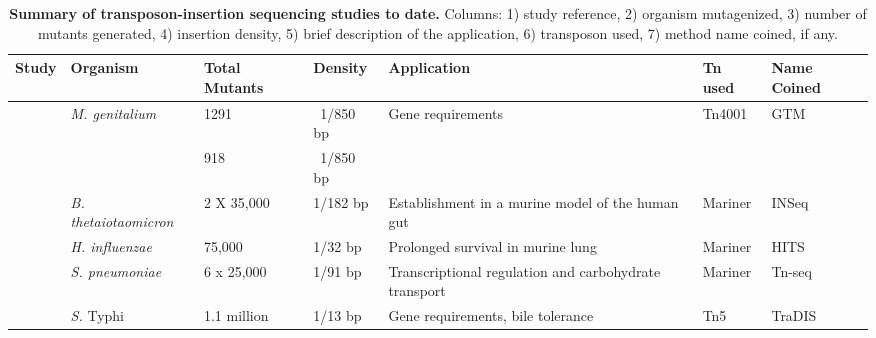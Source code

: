 %
\begingroup
\begin{landscape}
   \tiny
   \noindent
    \begin{longtable}{ l
    				l
				l
				l
				p{2in}
				l
				l}
    \caption[Summary of transposon-insertion sequencing studies to date]{\textbf{Summary of transposon-insertion sequencing studies to date.} Columns: 1) study reference,  2) organism mutagenized, 3) number of mutants generated, 4) insertion density, 5) brief description of the application, 6) transposon used, 7) method name coined, if any.}
    \\
    \toprule
    \textbf{Study} & \textbf{Organism} & \textbf{Total Mutants} & \textbf{Density} & \textbf{Application} & \textbf{Tn used } & \textbf{Name Coined} \\
    \midrule
    \multirow{2}[1]{*}{\textcite{Hutchison1999}}  & \multirow{2}[1]{*}{\textit{M. genitalium}} & 1291  &  ~1/850 bp & \multirow{2}[1]{2in}{Gene requirements} & \multirow{2}[1]{*}{Tn4001} & \multirow{2}[1]{*}{GTM\nomenclature{GTM}{Global transposon mutagenesis} } \\
          &  \textit{M. pneumoniae}     & 918   & ~1/850 bp &       &       &  \\
    \multirow{2}[0]{*}{\textcite{Goodman2009}} & \multirow{2}[0]{*}{\textit{B. thetaiotaomicron}} & \multirow{2}[0]{*}{2 X 35,000} & \multirow{2}[0]{*}{1/182 bp} & \multirow{2}[0]{2in}{Establishment in a murine model of the human gut} & \multirow{2}[0]{*}{Mariner} & \multirow{2}[0]{*}{INSeq} \\
          &       &       &       &       &       &  \\
    \multirow{2}[0]{*}{\textcite{Gawronski2009} } & \multirow{2}[0]{*}{\textit{H. influenzae}} & \multirow{2}[0]{*}{75,000} & \multirow{2}[0]{*}{1/32 bp} & \multirow{2}[0]{2in}{Prolonged survival in murine lung} & \multirow{2}[0]{*}{Mariner} & \multirow{2}[0]{*}{ HITS} \\
          &       &       &       &       &       &  \\
   \textcite{Opijnen2009}  & \textit{S. pneumoniae} & 6 x 25,000 & 1/91 bp & Transcriptional regulation and carbohydrate transport & Mariner & Tn-seq \\
    \multirow{2}[0]{*}{\textcite{Langridge2009a}}  & \multirow{2}[0]{*}{{\it S.} Typhi} & \multirow{2}[0]{*}{1.1 million} & 1/13 bp & \multirow{2}[0]{2in}{Gene requirements, bile tolerance} & \multirow{2}[0]{*}{Tn5} & \multirow{2}[0]{*}{TraDIS} \\

\end{longtable}
\end{landscape}
